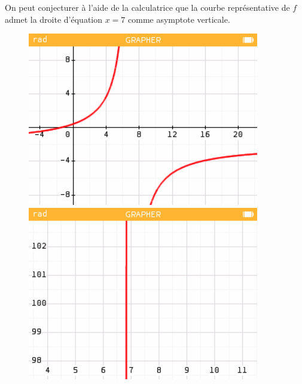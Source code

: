 \documentclass[a4paper,12pt,reqno,french]{article}
\begin{document}
	
	\begin{correc}
		
		On peut conjecturer à l'aide de la calculatrice que la courbe représentative de $f$ admet la droite d'équation $x=7$ comme asymptote verticale.
		\vspace{-1cm}
		\begin{figure}[H]
		\end{figure}
		\begin{figure}[H]
			\centering
			\begin{minipage}{.5\textwidth}
				\centering
			\includegraphics[width=0.9\textwidth]{scr1}
			\end{minipage}%
			\begin{minipage}{.5\textwidth}
				\centering
			\includegraphics[width=0.9\textwidth]{scr2}
			\end{minipage}
		\end{figure}
		
	\end{correc}
	
\end{document}
